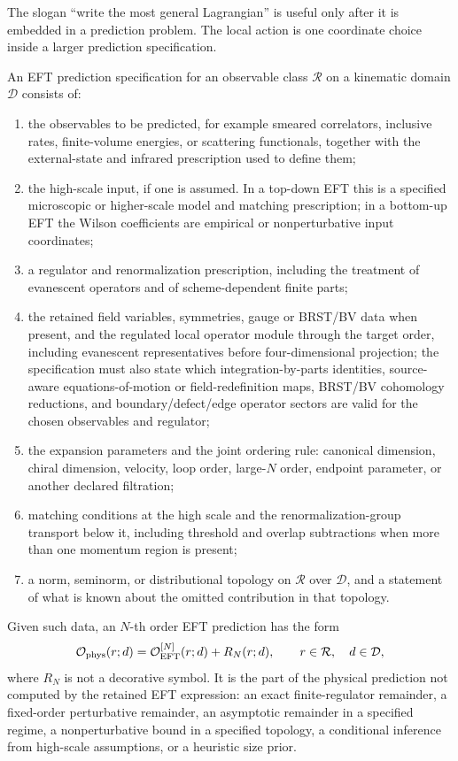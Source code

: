 The slogan ``write the most general Lagrangian'' is useful only after it is
embedded in a prediction problem.  The local action is one coordinate choice
inside a larger prediction specification.

\begin{definition}
\label{def:eft-prediction-datum}
An EFT prediction specification for an observable class \(\mathcal R\) on a
kinematic domain \(\mathcal D\) consists of:
\begin{enumerate}
  \item the observables to be predicted, for example smeared correlators,
  inclusive rates, finite-volume energies, or scattering functionals, together
  with the external-state and infrared prescription used to define them;
  \item the high-scale input, if one is assumed.  In a top-down EFT this is a
  specified microscopic or higher-scale model and matching prescription; in a
  bottom-up EFT the Wilson coefficients are empirical or nonperturbative input
  coordinates;
  \item a regulator and renormalization prescription, including the treatment
  of evanescent operators and of scheme-dependent finite parts;
  \item the retained field variables, symmetries, gauge or BRST/BV data when
  present, and the regulated local operator module through the target order,
  including evanescent representatives before four-dimensional projection;
  the specification must also state which integration-by-parts identities,
  source-aware equations-of-motion or field-redefinition maps, BRST/BV
  cohomology reductions, and boundary/defect/edge operator sectors are valid
  for the chosen observables and regulator;
  \item the expansion parameters and the joint ordering rule: canonical
  dimension, chiral dimension, velocity, loop order, large-\(N\) order,
  endpoint parameter, or another declared filtration;
  \item matching conditions at the high scale and the renormalization-group
  transport below it, including threshold and overlap subtractions when more
  than one momentum region is present;
  \item a norm, seminorm, or distributional topology on \(\mathcal R\) over
  \(\mathcal D\), and a statement of what is known about the omitted
  contribution in that topology.
\end{enumerate}
Given such data, an \(N\)-th order EFT prediction has the form
\begin{equation}
  \mathcal O_{\rm phys}(r;d)
  =
  \mathcal O_{\rm EFT}^{[N]}(r;d)
  +
  R_N(r;d),
  \qquad
  r\in\mathcal R,\quad d\in\mathcal D,
  \label{eq:eft-prediction-output-remainder}
\end{equation}
where \(R_N\) is not a decorative symbol.  It is the part of the physical
prediction not computed by the retained EFT expression: an exact
finite-regulator remainder, a fixed-order perturbative remainder, an
asymptotic remainder in a specified regime, a nonperturbative bound in a
specified topology, a conditional inference from high-scale assumptions, or a
heuristic size prior.
\end{definition}


